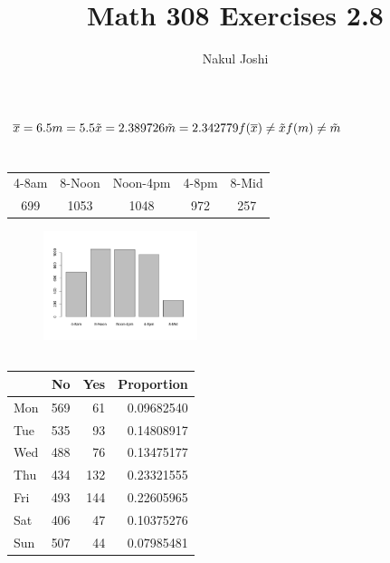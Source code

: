\documentclass[twocolumn]{article}
\title{Math 308 Exercises 2.8}
\author{Nakul Joshi}
\newcommand{\setsection}[1]{\setcounter{section}{#1}\section{}}
\begin{document}
\lstset{language=R}
\graphicspath{ {./img/} }
\maketitle

\setsection{2}
$
\overline{x}=6.5\\
m=5.5\\
\tilde{x}=2.389726\\
\tilde{m}=2.342779\\
f(\overline{x})\neq \tilde{x}\\
f(m)\neq \tilde{m}
$

\setsection{4}

\subsection{}
\begin{table}[h]
\centering
    \begin{tabular}{ccccc}
    4-8am & 8-Noon & Noon-4pm & 4-8pm & 8-Mid \\
    699   & 1053   & 1048     & 972   & 257   \\
    \end{tabular}
\end{table}
\begin{figure}[h]
\centering
\includegraphics[width=0.4\textwidth]{4a.pdf}
\end{figure}
\newpage

\subsection{}
\begin{table}[h]
\centering
\begin{tabular}{@{}lrrr@{}}
\toprule
  & No  & Yes & Proportion \\ \midrule
Mon & 569 & 61  & 0.09682540 \\
Tue & 535 & 93  & 0.14808917 \\
Wed & 488 & 76  & 0.13475177 \\
Thu & 434 & 132 & 0.23321555 \\
Fri & 493 & 144 & 0.22605965 \\
Sat & 406 & 47  & 0.10375276 \\
Sun & 507 & 44  & 0.07985481\\
\bottomrule
\end{tabular}
\end{table}
\end{document}
